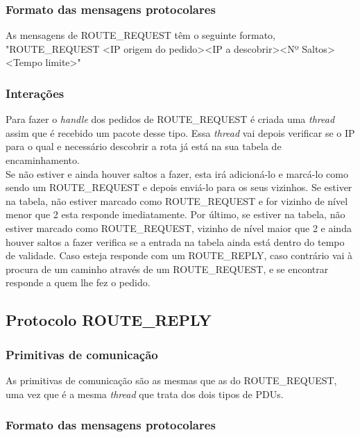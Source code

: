 \documentclass{llncs}
\begin{document}
\subsubsection{Formato das mensagens protocolares}

As mensagens de ROUTE\_REQUEST têm o seguinte formato, "ROUTE\_REQUEST \textless IP origem do pedido\textgreater \textless IP a descobrir\textgreater \textless Nº Saltos\textgreater \textless Tempo limite\textgreater"

\subsubsection{Interações}

Para fazer o \emph{handle} dos pedidos de ROUTE\_REQUEST é criada uma \emph{thread} assim que é recebido um pacote desse tipo. Essa \emph{thread} vai depois verificar se o IP para o qual e necessário descobrir a rota já está na sua tabela de encaminhamento.\\
Se não estiver e ainda houver saltos a fazer, esta irá adicioná-lo e marcá-lo como sendo um ROUTE\_REQUEST e depois enviá-lo para os seus vizinhos. Se estiver na tabela, não estiver marcado como ROUTE\_REQUEST e for vizinho de nível menor que 2 esta responde imediatamente. Por último, se estiver na tabela, não estiver marcado como ROUTE\_REQUEST, vizinho de nível maior que 2 e ainda houver saltos a fazer verifica se a entrada na tabela ainda está dentro do tempo de validade. Caso esteja responde com um ROUTE\_REPLY, caso contrário vai à procura de um caminho através de um ROUTE\_REQUEST, e se encontrar responde a quem lhe fez o pedido.

\subsection{Protocolo ROUTE\_REPLY}

\subsubsection{Primitivas de comunicação}

As primitivas de comunicação são as mesmas que as do ROUTE\_REQUEST, uma vez que é a mesma \emph{thread} que trata dos dois tipos de PDUs.

\subsubsection{Formato das mensagens protocolares}
\end{document}
